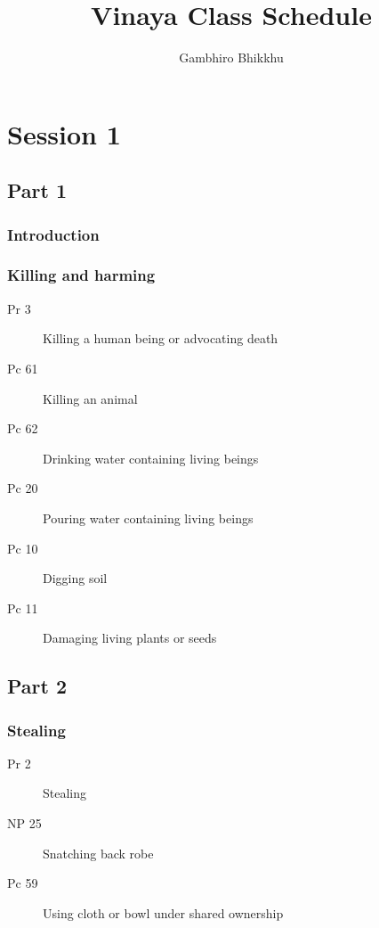 \documentclass[11pt,oneside]{memoir}
\title{Vinaya Class Schedule}
\author{Gambhiro Bhikkhu}
\begin{document}
\chapter{Session 1}

\begin{multicols}{2}

\section{Part 1}

\subsection{Introduction}

\subsection{Killing and harming}

\begin{description}
\item[Pr 3] Killing a human being or advocating death
\item[Pc 61] Killing an animal
\item[Pc 62] Drinking water containing living beings
\item[Pc 20] Pouring water containing living beings
\item[Pc 10] Digging soil
\item[Pc 11] Damaging living plants or seeds
\end{description}

\columnbreak

\section{Part 2}

\subsection{Stealing}

\begin{description}
\item[Pr 2] Stealing
\item[NP 25] Snatching back robe
\item[Pc 59] Using cloth or bowl under shared ownership
\end{description}

\end{multicols}
\end{document}

